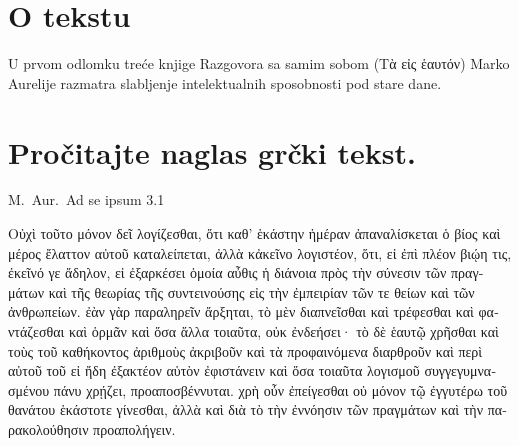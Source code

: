 \section*{O tekstu}

U prvom odlomku treće knjige Razgovora sa samim sobom \textgreek[variant=ancient]{(Tὰ εἰς ἑαυτόν)} Marko Aurelije razmatra slabljenje intelektualnih sposobnosti pod stare dane.

\section*{Pročitajte naglas grčki tekst.}

M.~Aur.\ Ad se ipsum 3.1


\medskip


{\large

\begin{greek}

\noindent Οὐχὶ τοῦτο μόνον δεῖ λογίζεσθαι, ὅτι καθ' ἑκάστην ἡμέραν ἀπαναλίσκεται ὁ βίος καὶ μέρος ἔλαττον αὐτοῦ καταλείπεται, ἀλλὰ κἀκεῖνο λογιστέον, ὅτι, εἰ ἐπὶ πλέον βιῴη τις, ἐκεῖνό γε ἄδηλον, εἰ ἐξαρκέσει ὁμοία αὖθις ἡ διάνοια πρὸς τὴν σύνεσιν τῶν πραγμάτων καὶ τῆς θεωρίας τῆς συντεινούσης εἰς τὴν ἐμπειρίαν τῶν τε θείων καὶ τῶν ἀνθρωπείων. ἐὰν γὰρ παραληρεῖν ἄρξηται, τὸ μὲν διαπνεῖσθαι καὶ τρέφεσθαι καὶ φαντάζεσθαι καὶ ὁρμᾶν καὶ ὅσα ἄλλα τοιαῦτα, οὐκ ἐνδεήσει· τὸ δὲ ἑαυτῷ χρῆσθαι καὶ τοὺς τοῦ καθήκοντος ἀριθμοὺς ἀκριβοῦν καὶ τὰ προφαινόμενα διαρθροῦν καὶ περὶ αὐτοῦ τοῦ εἰ ἤδη ἐξακτέον αὑτὸν ἐφιστάνειν καὶ ὅσα τοιαῦτα λογισμοῦ συγγεγυμνασμένου πάνυ χρῄζει, προαποσβέννυται. χρὴ οὖν ἐπείγεσθαι οὐ μόνον τῷ ἐγγυτέρω τοῦ θανάτου ἑκάστοτε γίνεσθαι, ἀλλὰ καὶ διὰ τὸ τὴν ἐννόησιν τῶν πραγμάτων καὶ τὴν παρακολούθησιν προαπολήγειν.


\end{greek}


}

